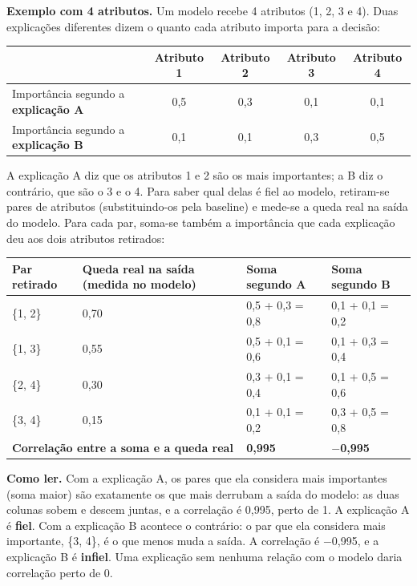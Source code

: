 \documentclass[11pt,a4paper]{article}
\begin{document}
\textbf{Exemplo com 4 atributos.} Um modelo recebe 4 atributos (1, 2, 3 e 4). Duas explicações diferentes dizem o quanto cada atributo importa para a decisão:

\begin{center}\small
\begin{tabular}{lcccc}
\toprule
& \textbf{Atributo 1} & \textbf{Atributo 2} & \textbf{Atributo 3} & \textbf{Atributo 4} \\
\midrule
Importância segundo a \textbf{explicação A} & 0,5 & 0,3 & 0,1 & 0,1 \\
Importância segundo a \textbf{explicação B} & 0,1 & 0,1 & 0,3 & 0,5 \\
\bottomrule
\end{tabular}
\end{center}

A explicação A diz que os atributos 1 e 2 são os mais importantes; a B diz o contrário, que são o 3 e o 4. Para saber qual delas é fiel ao modelo, retiram-se pares de atributos (substituindo-os pela baseline) e mede-se a queda real na saída do modelo. Para cada par, soma-se também a importância que cada explicação deu aos dois atributos retirados:

\begin{center}\small
\begin{tabularx}{\linewidth}{lXll}
\toprule
\textbf{Par retirado} & \textbf{Queda real na saída (medida no modelo)} & \textbf{Soma segundo A} & \textbf{Soma segundo B} \\
\midrule
\{1, 2\} & 0,70 & 0,5 + 0,3 = 0,8 & 0,1 + 0,1 = 0,2 \\
\{1, 3\} & 0,55 & 0,5 + 0,1 = 0,6 & 0,1 + 0,3 = 0,4 \\
\{2, 4\} & 0,30 & 0,3 + 0,1 = 0,4 & 0,1 + 0,5 = 0,6 \\
\{3, 4\} & 0,15 & 0,1 + 0,1 = 0,2 & 0,3 + 0,5 = 0,8 \\
\midrule
\multicolumn{2}{l}{\textbf{Correlação entre a soma e a queda real}} & \textbf{0,995} & \textbf{$-$0,995} \\
\bottomrule
\end{tabularx}
\end{center}

\textbf{Como ler.} Com a explicação A, os pares que ela considera mais importantes (soma maior) são exatamente os que mais derrubam a saída do modelo: as duas colunas sobem e descem juntas, e a correlação é 0,995, perto de 1. A explicação A é \textbf{fiel}. Com a explicação B acontece o contrário: o par que ela considera mais importante, \{3, 4\}, é o que menos muda a saída. A correlação é $-$0,995, e a explicação B é \textbf{infiel}. Uma explicação sem nenhuma relação com o modelo daria correlação perto de 0.
\end{document}

